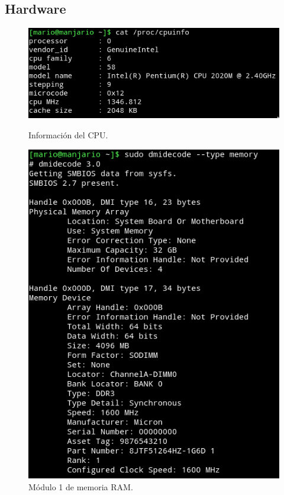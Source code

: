 \subsection{Hardware}
\begin{figure}[H] %
\centering
\includegraphics[scale=0.756]{ejercicio0/cpu.png}  %
\caption{Información del CPU.} 
\label{fig:figura1.1}
\includegraphics[scale=0.7]{ejercicio0/mem1.png}  %
\caption{Módulo 1 de memoria RAM.} 
\label{fig:figura1.2}
\end{figure}

